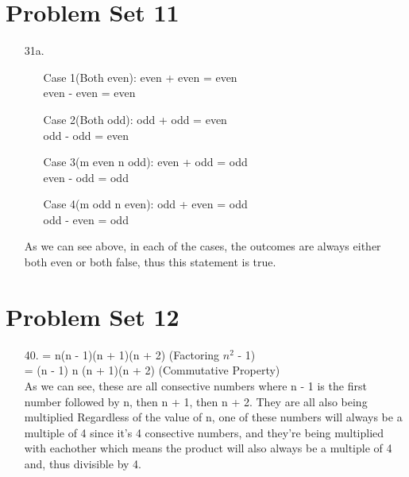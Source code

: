 \documentclass[12pt]{article}
\begin{document}
\section*{Problem Set 11}
\begin{itemize}
    \item [31a.]
    \item []
        \begin{itemize}
            \item [Case 1(Both even):]
                even + even = even \\
                even - even = even
            \item [Case 2(Both odd):]
                odd + odd = even \\
                odd - odd = even
            \item [Case 3(m even n odd):]
                even + odd = odd \\
                even - odd = odd
            \item [Case 4(m odd n even):]
                odd + even = odd \\
                odd - even = odd
        \end{itemize}
    As we can see above, in each of the cases, the outcomes are always either both even
    or both false, thus this statement is true.
\end{itemize}

\section*{Problem Set 12}
\begin{itemize}
    \item [40.]
        = n(n - 1)(n + 1)(n + 2) (Factoring $n^2$ - 1) \\
        = (n - 1) n (n + 1)(n + 2) (Commutative Property) \\
        As we can see, these are all consective numbers where n - 1 is the first
        number followed by n, then n + 1, then n + 2. They are all also being multiplied
        Regardless of the value of n, one of these numbers will always be a multiple of
        4 since it's 4 consective numbers, and they're being multiplied with eachother
        which means the product will also always be a multiple of 4 and, thus divisible
        by 4.
\end{itemize}
\end{document}
